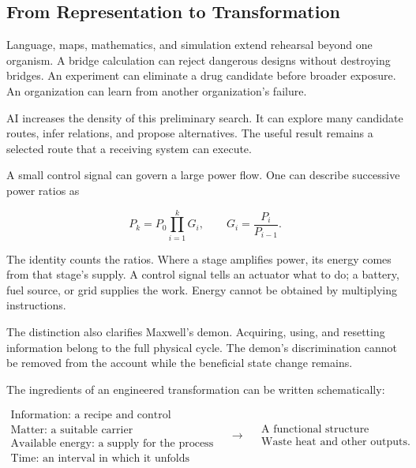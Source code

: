 \subsection{From Representation to Transformation}


Language, maps, mathematics, and simulation extend rehearsal beyond one organism. A bridge calculation can reject dangerous designs without destroying bridges. An experiment can eliminate a drug candidate before broader exposure. An organization can learn from another organization's failure.

AI increases the density of this preliminary search. It can explore many candidate routes, infer relations, and propose alternatives. The useful result remains a selected route that a receiving system can execute.

A small control signal can govern a large power flow. One can describe successive power ratios as

\begin{equation}
P_k=P_0\prod_{i=1}^{k}G_i,\qquad G_i=\frac{P_i}{P_{i-1}}.
\end{equation}

The identity counts the ratios. Where a stage amplifies power, its energy comes from that stage's supply. A control signal tells an actuator what to do; a battery, fuel source, or grid supplies the work. Energy cannot be obtained by multiplying instructions.

The distinction also clarifies Maxwell's demon. Acquiring, using, and resetting information belong to the full physical cycle. The demon's discrimination cannot be removed from the account while the beneficial state change remains.


The ingredients of an engineered transformation can be written schematically:

\begin{equation}
\begin{gathered}
\text{Information: a recipe and control}\\
\text{Matter: a suitable carrier}\\
\text{Available energy: a supply for the process}\\
\text{Time: an interval in which it unfolds}
\end{gathered}
\quad\longrightarrow\quad
\begin{gathered}
\text{A functional structure}\\
\text{Waste heat and other outputs}.
\end{gathered}
\label{eq:conservation}
\end{equation}

